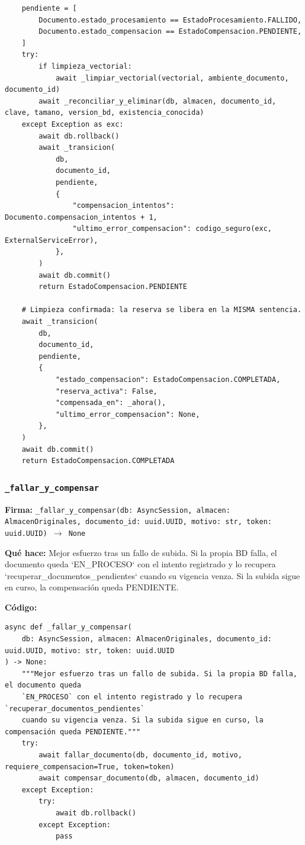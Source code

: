 \documentclass[11pt,a4paper]{article}
\begin{document}
\begin{lstlisting}
    pendiente = [
        Documento.estado_procesamiento == EstadoProcesamiento.FALLIDO,
        Documento.estado_compensacion == EstadoCompensacion.PENDIENTE,
    ]
    try:
        if limpieza_vectorial:
            await _limpiar_vectorial(vectorial, ambiente_documento, documento_id)
        await _reconciliar_y_eliminar(db, almacen, documento_id, clave, tamano, version_bd, existencia_conocida)
    except Exception as exc:
        await db.rollback()
        await _transicion(
            db,
            documento_id,
            pendiente,
            {
                "compensacion_intentos": Documento.compensacion_intentos + 1,
                "ultimo_error_compensacion": codigo_seguro(exc, ExternalServiceError),
            },
        )
        await db.commit()
        return EstadoCompensacion.PENDIENTE

    # Limpieza confirmada: la reserva se libera en la MISMA sentencia.
    await _transicion(
        db,
        documento_id,
        pendiente,
        {
            "estado_compensacion": EstadoCompensacion.COMPLETADA,
            "reserva_activa": False,
            "compensada_en": _ahora(),
            "ultimo_error_compensacion": None,
        },
    )
    await db.commit()
    return EstadoCompensacion.COMPLETADA
\end{lstlisting}

\subsubsection*{\texttt{\_fallar\_y\_compensar}}
\textbf{Firma:} \texttt{\_fallar\_y\_compensar(db: AsyncSession, almacen: AlmacenOriginales, documento\_id: uuid.UUID, motivo: str, token: uuid.UUID) $\rightarrow$ None}

\textbf{Qué hace:} Mejor esfuerzo tras un fallo de subida. Si la propia BD falla, el documento queda
`EN\_PROCESO` con el intento registrado y lo recupera `recuperar\_documentos\_pendientes`
cuando su vigencia venza. Si la subida sigue en curso, la compensación queda PENDIENTE.

\textbf{Código:}
\begin{lstlisting}
async def _fallar_y_compensar(
    db: AsyncSession, almacen: AlmacenOriginales, documento_id: uuid.UUID, motivo: str, token: uuid.UUID
) -> None:
    """Mejor esfuerzo tras un fallo de subida. Si la propia BD falla, el documento queda
    `EN_PROCESO` con el intento registrado y lo recupera `recuperar_documentos_pendientes`
    cuando su vigencia venza. Si la subida sigue en curso, la compensación queda PENDIENTE."""
    try:
        await fallar_documento(db, documento_id, motivo, requiere_compensacion=True, token=token)
        await compensar_documento(db, almacen, documento_id)
    except Exception:
        try:
            await db.rollback()
        except Exception:
            pass
\end{lstlisting}
\end{document}
